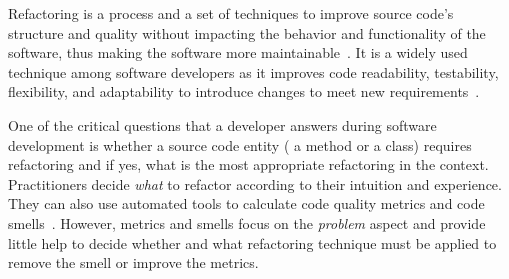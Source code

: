 Refactoring is a process and a set of techniques to improve source code's structure and quality without impacting the behavior and functionality of the software, thus making the software more maintainable~\cite{Opdyke1992Refactoring, Fowler1999Refactoring}. 
It is a widely used technique among software developers as it improves code readability, testability, flexibility, and adaptability to introduce changes to meet new requirements~\cite{Mens2004Survey}.

One of the critical questions that a developer answers during software development is whether a source code entity (\eg{} a method or a class) requires refactoring and if yes, what is the most appropriate refactoring in the context. 
Practitioners decide \textit{what} to refactor according to their intuition and experience. 
They can also use automated tools to calculate code quality metrics and code smells~\cite{Sharma2018}. 
However, metrics and smells focus on the \textit{problem} aspect and provide little help to decide whether and what refactoring technique must be applied to remove the smell or improve the metrics.



